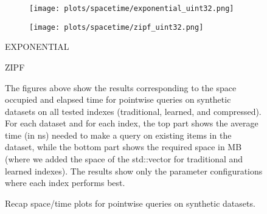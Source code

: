 \documentclass{article}
\begin{document}
\begin{figure}[!htbp]
{\begin{minipage}[t][0.98\textheight][t]{\textwidth}
    \begin{minipage}{0.48\linewidth}
        \begin{figure}[H]
        \texttt{[image: plots/spacetime/exponential\_uint32.png]}
        \end{figure}
    \end{minipage}
    \begin{minipage}{0.48\linewidth}
        \begin{figure}[H]
        \texttt{[image: plots/spacetime/zipf\_uint32.png]}
        \end{figure}
    \end{minipage}
    \begin{minipage}{0.48\linewidth}
    \begin{center}
        EXPONENTIAL
    \end{center}
    \end{minipage}
    \begin{minipage}{0.48\linewidth}
    \begin{center}
        ZIPF
    \end{center}
    \end{minipage}

    \vfill
    
    \begin{minipage}{\linewidth}
        The figures above show the results corresponding to the space occupied and elapsed time for pointwise queries on synthetic datasets on all tested indexes (traditional, learned, and compressed). For each dataset and for each index, the top part shows the average time (in ns) needed to make a query on existing items in the dataset, while the bottom part shows the required space in MB (where we added the space of the std::vector for traditional and learned indexes).  
    The results show only the parameter configurations where each index performs best. 
            \end{minipage}
    \vspace{10px}
\end{minipage}
}
\caption{Recap space/time plots for pointwise queries on synthetic datasets.}
\end{figure}
\end{document}
